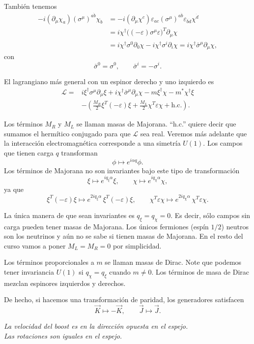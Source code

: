\documentclass[11pt,a4paper]{article}
\newcommand{\concept}[1]{\textcolor{concept-green}{#1}}
\begin{document}
También tenemos
\begin{align*}
  -i(\partial_\mu\chi_a)(\sigma^\mu)^{a\dot b}\chi_{\dot b}
  &=-i(\partial_\mu\chi^c)\varepsilon_{ac}
    (\sigma^\mu)^{a\dot b}\varepsilon_{\dot b\dot d}\chi^{\dot d} \\
  &=i\chi^\dagger\bigl(( -\varepsilon)\sigma^\mu\varepsilon\bigr)^T
    \partial_\mu\chi \\
  &=i\chi^\dagger\sigma^0\partial_0\chi
    -i\chi^\dagger\sigma^i\partial_i\chi
   =i\chi^\dagger\bar\sigma^\mu\partial_\mu\chi,
\end{align*}
con
\[
  \bar\sigma^0=\sigma^0,
  \qquad
  \bar\sigma^i=-\sigma^i.
\]

El lagrangiano más general con un espinor derecho y uno izquierdo es
\begin{align*}
  \mathcal L={}&
  i\xi^\dagger\sigma^\mu\partial_\mu\xi
  +i\chi^\dagger\bar\sigma^\mu\partial_\mu\chi
  -m\xi^\dagger\chi
  -m^*\chi^\dagger\xi \\
  &-\left(\frac{M_R}{2}\xi^T(-\varepsilon)\xi
  +\frac{M_L}{2}\chi^T\varepsilon\chi
  +\text{h.c.}\right).
\end{align*}

Los términos $M_R$ y $M_L$ se llaman \concept{masas de Majorana}. ``h.c.'' quiere decir que sumamos el hermítico conjugado para que $\mathcal L$ sea real. Veremos más adelante que la interacción electromagnética corresponde a una simetría $U(1)$. Los campos que tienen carga $q$ transforman
\[
  \phi\longmapsto e^{i\alpha q}\phi.
\]
Los términos de Majorana no son invariantes bajo este tipo de transformación
\[
  \xi\longmapsto e^{iq_\xi\alpha}\xi,
  \qquad
  \chi\longmapsto e^{iq_\chi\alpha}\chi,
\]
ya que
\[
  \xi^T(-\varepsilon)\xi
  \longmapsto
  e^{2iq_\xi\alpha}\,\xi^T(-\varepsilon)\xi,
  \qquad
  \chi^T\varepsilon\chi
  \longmapsto
  e^{2iq_\chi\alpha}\,\chi^T\varepsilon\chi.
\]

La única manera de que sean invariantes es $q_\xi=q_\chi=0$. Es decir, sólo campos sin carga pueden tener masas de Majorana. Los únicos fermiones (espín $1/2$) neutros son los neutrinos y aún no se sabe si tienen masas de Majorana. En el resto del curso vamos a poner $M_L=M_R=0$ por simplicidad.

Los términos proporcionales a $m$ se llaman \concept{masas de Dirac}. Note que podemos tener invariancia $U(1)$ si $q_\chi=q_\xi$ cuando $m\neq0$. Los términos de masa de Dirac mezclan espinores izquierdos y derechos.

De hecho, si hacemos una transformación de paridad, los generadores satisfacen
\[
  \vec K\longmapsto-\vec K,
  \qquad
  \vec J\longmapsto\vec J.
\]
\begin{center}
  \emph{La velocidad del boost es en la dirección opuesta en el espejo.}\\
  \emph{Las rotaciones son iguales en el espejo.}
\end{center}
\end{document}
